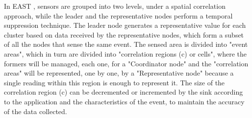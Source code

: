 \documentclass[conference]{IEEEtran}
\begin{document}
In EAST \cite{Villas2012}, sensors are grouped into two levels, under a spatial
correlation approach, while the leader and the representative nodes perform a
temporal suppression technique.
The leader node generates a representative value for each cluster based on data
received by the representative nodes, which form a subset of all the nodes that
sense the same event. The sensed area is divided into "event areas", which in
turn are divided into "correlation regions (c) or cells", where the formers will
be managed, each one, for a "Coordinator node" and the "correlation areas" will
be represented, one by one, by a "Representative node" because a single reading
within this region is enough to represent it.
The size of the correlation region (c) can be decremented or incremented by the
sink according to the application and the characteristics of the event, to
maintain the accuracy of the data collected.
\end{document}
